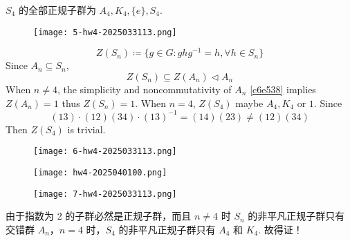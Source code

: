 $S_4$ 的全部正规子群为 $A_4,K_4,\{ e \},S_4$.
\begin{figure}[H]
\centering
\texttt{[image: 5-hw4-2025033113.png]}
\label{}
\end{figure}
\[
Z(S_n)\coloneqq \{ g\in G:ghg^{-1}=h,\forall h\in S_n \}
\]
Since $A_n\subseteq S_n$,
\[
Z(S_n)\subseteq Z(A_n)\lhd A_n
\]
When $n\neq4$, the simplicity and noncommutativity of $A_n$ \cref{c6e538}  implies $Z(A_n)=1$ thus $Z(S_n)=1$. When $n=4$, $Z(S_4)$ maybe $A_4,K_4$ or $1$. Since
\[
(13)\cdot(12)(34)\cdot(13)^{-1}=(14)(23)\neq (12)(34)
\]
Then $Z(S_4)$ is trivial.

\begin{figure}[H]
\centering
\texttt{[image: 6-hw4-2025033113.png]}
\label{}
\end{figure}

\begin{figure}[H]
\centering
\texttt{[image: hw4-2025040100.png]}
\label{}
\end{figure}

\begin{figure}[H]
\centering
\texttt{[image: 7-hw4-2025033113.png]}
\label{}
\end{figure}

由于指数为 2 的子群必然是正规子群，而且 $n\neq4$ 时 $S_n$ 的非平凡正规子群只有交错群 $A_n$，$n=4$ 时，$S_4$ 的非平凡正规子群只有 $A_4$ 和 $K_4$. 故得证！
